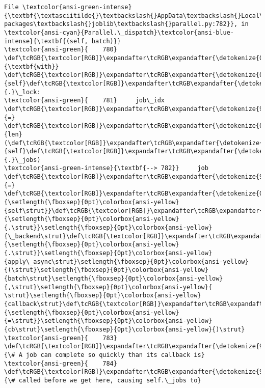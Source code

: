 \documentclass[11pt]{article}
\begin{document}
\begin{Verbatim}[commandchars=\\\{\}, frame=single, framerule=2mm, rulecolor=\color{outerrorbackground}]
File \textcolor{ansi-green-intense}{\textbf{\textasciitilde{}\textbackslash{}AppData\textbackslash{}Local\textbackslash{}anaconda3\textbackslash{}lib\textbackslash{}site-packages\textbackslash{}joblib\textbackslash{}parallel.py:782}}, in \textcolor{ansi-cyan}{Parallel.\_dispatch}\textcolor{ansi-blue-intense}{\textbf{(self, batch)}}
\textcolor{ansi-green}{    780} \def\tcRGB{\textcolor[RGB]}\expandafter\tcRGB\expandafter{\detokenize{0,135,0}}{\textbf{with}} \def\tcRGB{\textcolor[RGB]}\expandafter\tcRGB\expandafter{\detokenize{0,135,0}}{self}\def\tcRGB{\textcolor[RGB]}\expandafter\tcRGB\expandafter{\detokenize{98,98,98}}{.}\_lock:
\textcolor{ansi-green}{    781}     job\_idx \def\tcRGB{\textcolor[RGB]}\expandafter\tcRGB\expandafter{\detokenize{98,98,98}}{=} \def\tcRGB{\textcolor[RGB]}\expandafter\tcRGB\expandafter{\detokenize{0,135,0}}{len}(\def\tcRGB{\textcolor[RGB]}\expandafter\tcRGB\expandafter{\detokenize{0,135,0}}{self}\def\tcRGB{\textcolor[RGB]}\expandafter\tcRGB\expandafter{\detokenize{98,98,98}}{.}\_jobs)
\textcolor{ansi-green-intense}{\textbf{--> 782}}     job \def\tcRGB{\textcolor[RGB]}\expandafter\tcRGB\expandafter{\detokenize{98,98,98}}{=} \def\tcRGB{\textcolor[RGB]}\expandafter\tcRGB\expandafter{\detokenize{0,135,0}}{\setlength{\fboxsep}{0pt}\colorbox{ansi-yellow}{self\strut}}\def\tcRGB{\textcolor[RGB]}\expandafter\tcRGB\expandafter{\detokenize{98,98,98}}{\setlength{\fboxsep}{0pt}\colorbox{ansi-yellow}{.\strut}}\setlength{\fboxsep}{0pt}\colorbox{ansi-yellow}{\_backend\strut}\def\tcRGB{\textcolor[RGB]}\expandafter\tcRGB\expandafter{\detokenize{98,98,98}}{\setlength{\fboxsep}{0pt}\colorbox{ansi-yellow}{.\strut}}\setlength{\fboxsep}{0pt}\colorbox{ansi-yellow}{apply\_async\strut}\setlength{\fboxsep}{0pt}\colorbox{ansi-yellow}{(\strut}\setlength{\fboxsep}{0pt}\colorbox{ansi-yellow}{batch\strut}\setlength{\fboxsep}{0pt}\colorbox{ansi-yellow}{,\strut}\setlength{\fboxsep}{0pt}\colorbox{ansi-yellow}{ \strut}\setlength{\fboxsep}{0pt}\colorbox{ansi-yellow}{callback\strut}\def\tcRGB{\textcolor[RGB]}\expandafter\tcRGB\expandafter{\detokenize{98,98,98}}{\setlength{\fboxsep}{0pt}\colorbox{ansi-yellow}{=\strut}}\setlength{\fboxsep}{0pt}\colorbox{ansi-yellow}{cb\strut}\setlength{\fboxsep}{0pt}\colorbox{ansi-yellow}{)\strut}
\textcolor{ansi-green}{    783}     \def\tcRGB{\textcolor[RGB]}\expandafter\tcRGB\expandafter{\detokenize{95,135,135}}{\# A job can complete so quickly than its callback is}
\textcolor{ansi-green}{    784}     \def\tcRGB{\textcolor[RGB]}\expandafter\tcRGB\expandafter{\detokenize{95,135,135}}{\# called before we get here, causing self.\_jobs to}

\end{Verbatim}
\end{document}
